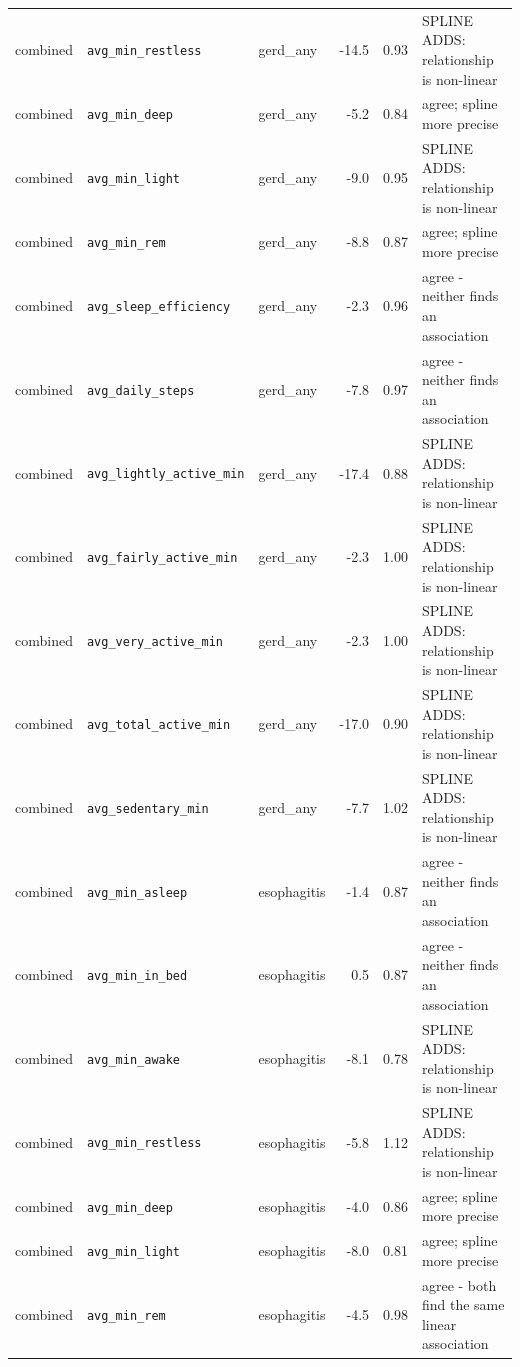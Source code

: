 \documentclass[11pt]{article}
\newcommand{\code}[1]{\texttt{\small #1}}
\begin{document}
\begin{longtable}{@{}p{2.0cm}p{3.4cm}p{2.4cm}rr p{3.2cm}@{}}
combined & \code{avg\_min\_restless} & gerd\_any & -14.5 & 0.93 & SPLINE ADDS: relationship is non-linear \\
combined & \code{avg\_min\_deep} & gerd\_any & -5.2 & 0.84 & agree; spline more precise \\
combined & \code{avg\_min\_light} & gerd\_any & -9.0 & 0.95 & SPLINE ADDS: relationship is non-linear \\
combined & \code{avg\_min\_rem} & gerd\_any & -8.8 & 0.87 & agree; spline more precise \\
combined & \code{avg\_sleep\_efficiency} & gerd\_any & -2.3 & 0.96 & agree - neither finds an association \\
combined & \code{avg\_daily\_steps} & gerd\_any & -7.8 & 0.97 & agree - neither finds an association \\
combined & \code{avg\_lightly\_active\_min} & gerd\_any & -17.4 & 0.88 & SPLINE ADDS: relationship is non-linear \\
combined & \code{avg\_fairly\_active\_min} & gerd\_any & -2.3 & 1.00 & SPLINE ADDS: relationship is non-linear \\
combined & \code{avg\_very\_active\_min} & gerd\_any & -2.3 & 1.00 & SPLINE ADDS: relationship is non-linear \\
combined & \code{avg\_total\_active\_min} & gerd\_any & -17.0 & 0.90 & SPLINE ADDS: relationship is non-linear \\
combined & \code{avg\_sedentary\_min} & gerd\_any & -7.7 & 1.02 & SPLINE ADDS: relationship is non-linear \\
combined & \code{avg\_min\_asleep} & esophagitis & -1.4 & 0.87 & agree - neither finds an association \\
combined & \code{avg\_min\_in\_bed} & esophagitis & 0.5 & 0.87 & agree - neither finds an association \\
combined & \code{avg\_min\_awake} & esophagitis & -8.1 & 0.78 & SPLINE ADDS: relationship is non-linear \\
combined & \code{avg\_min\_restless} & esophagitis & -5.8 & 1.12 & SPLINE ADDS: relationship is non-linear \\
combined & \code{avg\_min\_deep} & esophagitis & -4.0 & 0.86 & agree; spline more precise \\
combined & \code{avg\_min\_light} & esophagitis & -8.0 & 0.81 & agree; spline more precise \\
combined & \code{avg\_min\_rem} & esophagitis & -4.5 & 0.98 & agree - both find the same linear association \\

\end{longtable}
\end{document}
